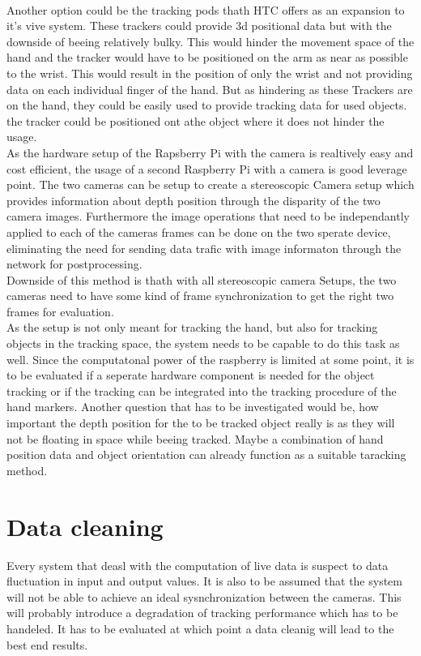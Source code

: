 \\Another option could be the tracking  pods thath HTC offers as an expansion to it's vive system. These trackers could provide 3d positional data but with the downside of beeing relatively bulky. This would hinder the movement space of the hand and the tracker would have to be positioned on the arm as near as possible to the wrist. This would result in the position of only the wrist and not providing data on each individual finger of the hand. But as hindering as these Trackers are on the hand, they could be easily used to provide tracking data for used objects. the tracker could be positioned ont athe object where it does not hinder the usage. \\
As the hardware setup of the Rapsberry Pi with the camera is realtively easy and cost efficient, the usage of a second Raspberry Pi with a camera is good leverage point. The two cameras can be setup to create a stereoscopic Camera setup which provides information about depth position through the disparity of the two camera images. 
Furthermore the image operations that need to be independantly applied to each of the cameras frames can be done on the two sperate device, eliminating the need for sending data trafic with image informaton through the network for postprocessing.
\\Downside of this method is thath with all stereoscopic camera Setups, the two cameras need to have some kind of frame synchronization to get the right two frames for evaluation.
\\As the setup is not only meant for tracking the hand, but also for tracking objects in the tracking space, the system needs to be capable to do this task as well. Since the computatonal power of the raspberry is limited at some point, it is to be evaluated if a seperate hardware component is needed for the object tracking or if the tracking can be integrated into the tracking procedure of the hand markers. Another question that has to be investigated would be, how important the depth position for the to be tracked object really is as they will not be floating in space while beeing tracked. Maybe a combination of hand position data and object orientation can already function as a suitable taracking method.
\section{Data cleaning}
Every system that deasl with the computation of live data is suspect to data fluctuation in input and output values. It is also to be assumed that the system will not be able to achieve an ideal sysnchronization between the cameras. This will probably introduce a degradation of tracking performance which has to be handeled. It has to be evaluated at which point a data cleanig will lead to the best end results.
